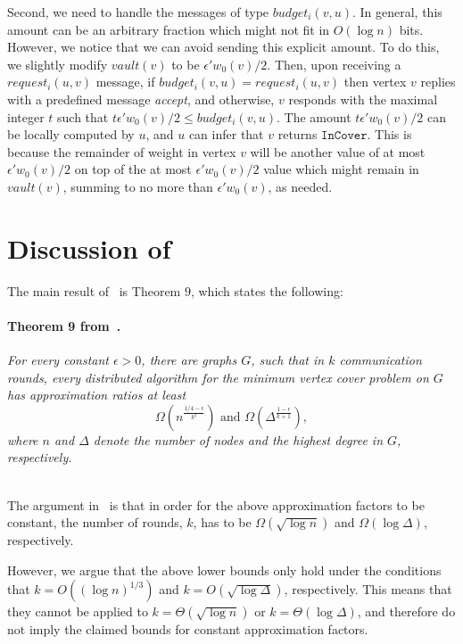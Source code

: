 \documentclass[11pt]{article}
\newcommand{\Deal}{request}
\newcommand{\Vault}{vault}
\newcommand{\Budget}{budget}
\newcommand{\InCover}{\texttt{InCover}}
\begin{document}
Second, we need to handle the messages of type $\Budget_i(v,u)$. In general, this amount can be an arbitrary fraction which might not fit in $O(\log{n})$ bits. However, we notice that we can avoid sending this explicit amount. To do this, we slightly modify $\Vault(v)$ to be $\epsilon'w_0(v)/2$. Then, upon receiving a $\Deal_i(u,v)$ message, if $\Budget_i(v,u)=\Deal_i(u,v)$ then vertex $v$ replies with a predefined message \emph{accept}, and otherwise, $v$ responds with the maximal integer $t$ such that $t\epsilon'w_0(v)/2 \leq \Budget_i(v,u)$. The amount $t\epsilon'w_0(v)/2$ can be locally computed by $u$, and $u$ can infer that $v$ returns $\InCover$. This is because the remainder of weight in vertex $v$ will be another value of at most $\epsilon'w_0(v)/2$ on top of the at most $\epsilon'w_0(v)/2$ value which might remain in $\Vault(v)$, summing to no more than $\epsilon'w_0(v)$, as needed.

\section{Discussion of~\cite{KMW10}}
\label{sec:refutation}
The main result of~\cite{KMW10} is Theorem $9$, which states the following:

\paragraph{Theorem 9 from~\cite{KMW10}.}
\textit{
For every constant $\epsilon>0$, there are graphs $G$, such that in $k$ communication rounds, every distributed algorithm for the minimum vertex cover problem on $G$ has approximation ratios at least $$\Omega\left(n^{\frac{1/4-\epsilon}{k^2}}\right) \mbox{ and } \Omega\left(\Delta^{\frac{1-\epsilon}{k+1}}\right),$$
where $n$ and $\Delta$ denote the number of nodes and the highest degree in $G$, respectively.
}

~\\

The argument in~\cite{KMW10} is that in order for the above approximation factors to be constant, the number of rounds, $k$, has to be $\Omega(\sqrt{\log{n}})$ and $\Omega(\log{\Delta})$, respectively.

However, we argue that the above lower bounds only hold under the conditions that $k = O((\log{n})^{1/3})$ and $k = O(\sqrt{\log{\Delta}})$, respectively. This means that they cannot be applied to $k=\Theta(\sqrt{\log{n}})$ or $k=\Theta(\log{\Delta})$, and therefore do not imply the claimed bounds for constant approximation factors.
\end{document}
